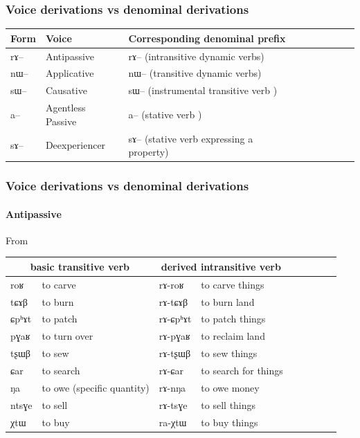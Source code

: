 \documentclass[xcolor=table]{beamer}
\newcommand{\ipa}[1]{{\phon \mbox{#1}}} %
\begin{document}
  \begin{frame} 
 \frametitle{Voice derivations vs denominal derivations} 
 
\begin{tabular}{lllllllll} \toprule
Form& Voice & Corresponding denominal prefix \\
\midrule
\ipa{rɤ}-- & Antipassive &    \ipa{rɤ}-- (intransitive dynamic verbs)\\
\ipa{nɯ}-- & Applicative &    \ipa{nɯ}-- (transitive dynamic verbs)\\
\ipa{sɯ}-- & Causative &    \ipa{sɯ}-- (instrumental transitive verb )\\
\ipa{a}-- & Agentless Passive &    \ipa{a}-- (stative verb )\\
\ipa{sɤ}--  & Deexperiencer &    \ipa{sɤ}-- (stative verb expressing a property)\\
    \bottomrule
\end{tabular}

\end{frame}   

\begin{frame} 
\frametitle{Voice derivations vs denominal derivations} 
\framesubtitle{Antipassive} 

From \citet{jacques14antipassive}

\begin{tabular}{lllllllll} \toprule
\multicolumn{2}{c}{basic  transitive verb}  & \multicolumn{2}{c}{derived  intransitive verb}  \\
\midrule
\ipa{roʁ}   &	to carve &  	\ipa{rɤ-roʁ}   &	to carve things \\  
\ipa{tɕɤβ}   &	to burn &  	\ipa{rɤ-tɕɤβ}   &	to burn land \\  
\ipa{ɕpʰɤt}   &	to patch &  	\ipa{rɤ-ɕpʰɤt}   &	to patch things \\  
\ipa{pɣaʁ}   &	to turn over &  	\ipa{rɤ-pɣaʁ}   &	to reclaim land \\  
\ipa{tʂɯβ}   &	to sew &  	\ipa{rɤ-tʂɯβ}   &	 to sew things \\   
\ipa{ɕar}   &	to search &  	\ipa{rɤ-ɕar}   &	to search for things \\ 
\ipa{ŋa}   &	to owe  (specific quantity)&  	\ipa{rɤ-nŋa}   &	to owe money \\  
\ipa{ntsɣe}   &	to sell &  	\ipa{rɤ-tsɣe}   &	to sell things \\  
\ipa{χtɯ}   &	to buy &  	\ipa{ra-χtɯ}   &	to buy things \\  
\bottomrule
\end{tabular}
\end{frame}   
\end{document}
